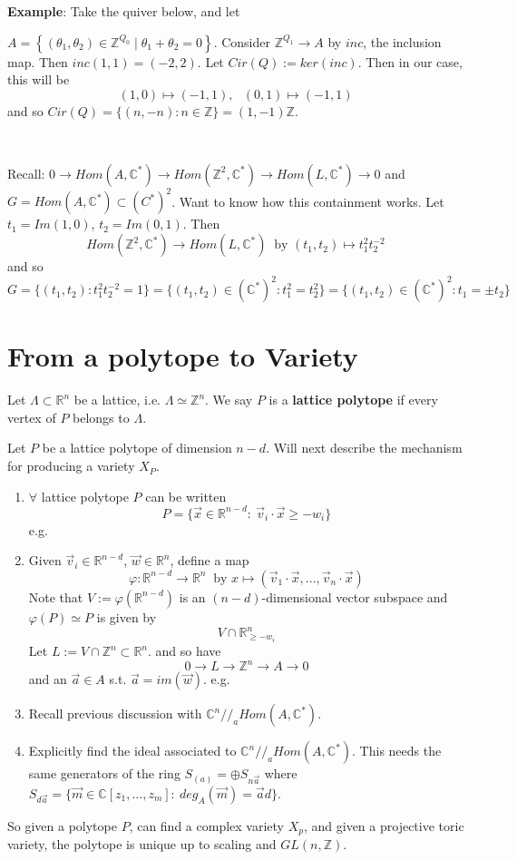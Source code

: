 \documentclass{article}
\newcommand{\C}{\mathbb{C}}
\newcommand{\R}{\mathbb{R}}
\newcommand{\Z}{\mathbb{Z}}
\begin{document}
		\noindent\textbf{Example}: Take the quiver below, and let \\
		\begin{minipage}{0.65\textwidth}
		$A=\left\{(\theta_1,\theta_2)\in\Z^{Q_0}\mid\theta_1+\theta_2=0\right\}$. 
		Consider $\Z^{Q_1}\to A$ by $inc$, the inclusion map. 
		Then $inc(1,1)=(-2,2)$.  Let $Cir(Q):=ker(inc)$. Then in 
		our case, this will be 
		$$ (1,0)\mapsto(-1,1),~~~ (0,1)\mapsto(-1,1)$$
		and so $Cir(Q)=\{(n,-n):n\in\Z\}=(1,-1)\Z$.
		\end{minipage}~\begin{minipage}{0.3\textwidth}
		\end{minipage}

		Recall: $0\to Hom(A,\C^*)\to Hom(\Z^2,\C^*)\to Hom(L,\C^*)\to0$
		and $G= Hom(A,\C^*)\subset(C^*)^2$. Want to know how this containment 
		works. Let $t_1=Im(1,0)$, $t_2=Im(0,1)$. Then 
		$$Hom(\Z^2,\C^*)\to Hom(L,\C^*)~\text{ by }
		(t_1,t_2)\mapsto t_1^2t_2^{-2}$$
		and so $G=\{(t_1,t_2):t_1^2t_2^{-2}=1\}=
		\{(t_1,t_2)\in(\C^*)^2:t_1^2=t_2^2\}=\{(t_1,t_2)\in(\C^*)^2:t_1=\pm t_2\}$

	\section{From a polytope to Variety}
	Let $\Lambda\subset\R^n$ be a lattice, i.e. $\Lambda\simeq\Z^n$. 
	We say $P$ is a \textbf{lattice polytope} if every vertex of $P$ 
	belongs to $\Lambda$. 

	Let $P$ be a lattice polytope of dimension $n-d$. Will next describe 
	the mechanism for producing a variety $X_P$. 

	\begin{enumerate}
		\item $\forall$ lattice polytope $P$ can be written 
		$$P=\{\vec{x}\in\R^{n-d}:~\vec{v}_i\cdot\vec{x}\ge-w_i\}$$
		e.g. 
	\item Given $\vec{v}_i\in\R^{n-d}$, $\vec{w}\in\R^n$, define a map 
		$$\varphi:\R^{n-d}\to\R^n~\text{ by } x\mapsto(
		\vec{v}_1\cdot\vec{x},...,\vec{v}_n\cdot\vec{x})$$
		Note that $V:=\varphi(\R^{n-d})$ is an $(n-d)$-dimensional 
		vector subspace and $\varphi(P)\simeq P$ is given by 
		$$V\cap\R^n_{\ge-w_i}$$
		Let $L:=V\cap\Z^n\subset\R^n$. 
		and so have $$0\to L\to\Z^n\to A\to0$$ and an 
		$\vec{a}\in A$ s.t. $\vec{a}=im(\vec{w})$. 
		e.g. 
	\item Recall previous discussion with $\C^n//_a Hom(A,\C^*)$. 
	\item Explicitly find the ideal associated to $\C^n//_aHom(A,\C^*)$. 
	This needs the same generators of the ring $S_{(a)}=\oplus S_{n\vec{a}}$
	where $S_{d\vec{a}}=\{\vec{m}\in\C[z_1,...,z_m]:~deg_A(\vec{m})=\vec{a}d\}$. 
	\end{enumerate}
	So given a polytope $P$, can find a complex variety $X_p$, and given 
	a projective toric variety, the polytope is unique up to scaling and 
	$GL(n,\Z)$. 
\end{document}
